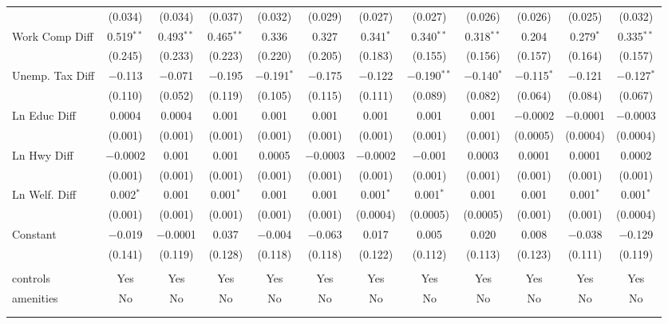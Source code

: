 \begin{table}[!htbp]
\begin{tabular}{@{\extracolsep{5pt}}lccccccccccc}
  & (0.034) & (0.034) & (0.037) & (0.032) & (0.029) & (0.027) & (0.027) & (0.026) & (0.026) & (0.025) & (0.032) \\ 
  Work Comp Diff & 0.519$^{**}$ & 0.493$^{**}$ & 0.465$^{**}$ & 0.336 & 0.327 & 0.341$^{*}$ & 0.340$^{**}$ & 0.318$^{**}$ & 0.204 & 0.279$^{*}$ & 0.335$^{**}$ \\ 
  & (0.245) & (0.233) & (0.223) & (0.220) & (0.205) & (0.183) & (0.155) & (0.156) & (0.157) & (0.164) & (0.157) \\ 
  Unemp. Tax Diff & $-$0.113 & $-$0.071 & $-$0.195 & $-$0.191$^{*}$ & $-$0.175 & $-$0.122 & $-$0.190$^{**}$ & $-$0.140$^{*}$ & $-$0.115$^{*}$ & $-$0.121 & $-$0.127$^{*}$ \\ 
  & (0.110) & (0.052) & (0.119) & (0.105) & (0.115) & (0.111) & (0.089) & (0.082) & (0.064) & (0.084) & (0.067) \\ 
  Ln Educ Diff & 0.0004 & 0.0004 & 0.001 & 0.001 & 0.001 & 0.001 & 0.001 & 0.001 & $-$0.0002 & $-$0.0001 & $-$0.0003 \\ 
  & (0.001) & (0.001) & (0.001) & (0.001) & (0.001) & (0.001) & (0.001) & (0.001) & (0.0005) & (0.0004) & (0.0004) \\ 
  Ln Hwy Diff & $-$0.0002 & 0.001 & 0.001 & 0.0005 & $-$0.0003 & $-$0.0002 & $-$0.001 & 0.0003 & 0.0001 & 0.0001 & 0.0002 \\ 
  & (0.001) & (0.001) & (0.001) & (0.001) & (0.001) & (0.001) & (0.001) & (0.001) & (0.001) & (0.001) & (0.001) \\ 
  Ln Welf. Diff & 0.002$^{*}$ & 0.001 & 0.001$^{*}$ & 0.001 & 0.001 & 0.001$^{*}$ & 0.001$^{*}$ & 0.001 & 0.001 & 0.001$^{*}$ & 0.001$^{*}$ \\ 
  & (0.001) & (0.001) & (0.001) & (0.001) & (0.001) & (0.0004) & (0.0005) & (0.0005) & (0.001) & (0.001) & (0.0004) \\ 
  Constant & $-$0.019 & $-$0.0001 & 0.037 & $-$0.004 & $-$0.063 & 0.017 & 0.005 & 0.020 & 0.008 & $-$0.038 & $-$0.129 \\ 
  & (0.141) & (0.119) & (0.128) & (0.118) & (0.118) & (0.122) & (0.112) & (0.113) & (0.123) & (0.111) & (0.119) \\ 
 \hline \\[-1.8ex] 
controls & Yes & Yes & Yes & Yes & Yes & Yes & Yes & Yes & Yes & Yes & Yes \\ 
amenities & No & No & No & No & No & No & No & No & No & No & No \\ 
\hline \\[-1.8ex] 
\hline 
\hline \\[-1.8ex] 
\end{tabular} 
\end{table} 
